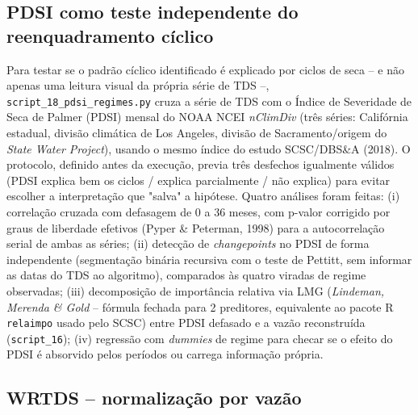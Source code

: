 \subsection{PDSI como teste independente do reenquadramento cíclico}

Para testar se o padrão cíclico identificado é explicado por ciclos de seca -- e não apenas uma leitura visual da própria série de TDS --, \texttt{script\_18\_pdsi\_regimes.py} cruza a série de TDS com o Índice de Severidade de Seca de Palmer (PDSI) mensal do NOAA NCEI \textit{nClimDiv} (três séries: Califórnia estadual, divisão climática de Los Angeles, divisão de Sacramento/origem do \textit{State Water Project}), usando o mesmo índice do estudo SCSC/DBS\&A (2018). O protocolo, definido antes da execução, previa três desfechos igualmente válidos (PDSI explica bem os ciclos / explica parcialmente / não explica) para evitar escolher a interpretação que "salva" a hipótese. Quatro análises foram feitas: (i) correlação cruzada com defasagem de 0 a 36 meses, com p-valor corrigido por graus de liberdade efetivos (Pyper \& Peterman, 1998) para a autocorrelação serial de ambas as séries; (ii) detecção de \textit{changepoints} no PDSI de forma independente (segmentação binária recursiva com o teste de Pettitt, sem informar as datas do TDS ao algoritmo), comparados às quatro viradas de regime observadas; (iii) decomposição de importância relativa via LMG (\textit{Lindeman, Merenda \& Gold} -- fórmula fechada para 2 preditores, equivalente ao pacote R \texttt{relaimpo} usado pelo SCSC) entre PDSI defasado e a vazão reconstruída (\texttt{script\_16}); (iv) regressão com \textit{dummies} de regime para checar se o efeito do PDSI é absorvido pelos períodos ou carrega informação própria.

\subsection{WRTDS -- normalização por vazão}

